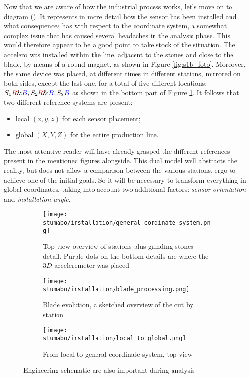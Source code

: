 Now that we are aware of how the industrial process works, let's move on to diagram ().
It represents in more detail how the sensor has been installed and what consequences has with respect to the coordinate system, 
a somewhat complex issue that has caused several  headaches in the analysis phase. This would therefore appear to be a good point to take stock of the situation.
The  accelero was installed within the line, adjacent to the stones and close to the blade, by means of a round magnet, as shown in Figure \ref{fig:s1b_foto}.
Moreover, the same device was placed, at different times in different stations, mirrored on both sides, except the last one, for a total of five different locations: 
${S_{1}\textcolor{red}{R}\&\textcolor{blue}{B}, S_{2}\textcolor{red}{R}\&\textcolor{blue}{B}, S_{3}\textcolor{blue}{B}}$ as shown in the bottom part of Figure \ref{fig:top_view_line}.
It follows that two different reference systems are present:
\begin{itemize}
    \item local $(x,y,z)$ for each sensor placement;
    \item global $(X,Y,Z)$ for the entire production line.
\end{itemize}
The most attentive reader will have already grasped the different references present in the mentioned figures alongside. %
This dual model well abstracts the reality, but does not allow a comparison between the various stations,  ergo to achieve one of the initial goals.
So it will be necessary to transform everything in global coordinates, taking into account two additional factors:
 \textit{sensor orientation} and 
 \textit{installation angle}. 
\begin{figure}[!htp]
    \begin{subfigure}{\textwidth}
        \texttt{[image: stumabo/installation/general\_cordinate\_system.png]}
        \caption{Top view overview of stations plus grinding stones detail.
            Purple dots on the bottom details are where the $3D$ accelerometer was placed}
        \label{fig:top_view_line}
    \end{subfigure}
    \begin{subfigure}{\textwidth}
        \texttt{[image: stumabo/installation/blade\_processing.png]}
        \caption{Blade evolution, a sketched overview of the cut by station}
        \label{fig:blade_evolution}
    \end{subfigure}
    \begin{subfigure}{\textwidth}
        \texttt{[image: stumabo/installation/local\_to\_global.png]}
        \caption{From local to general coordinate system, top view}
        \label{fig:local_to_global}
    \end{subfigure}
    \caption{Engineering schematic are also important during analysis}
    \label{fig:engineering_files}
\end{figure}

